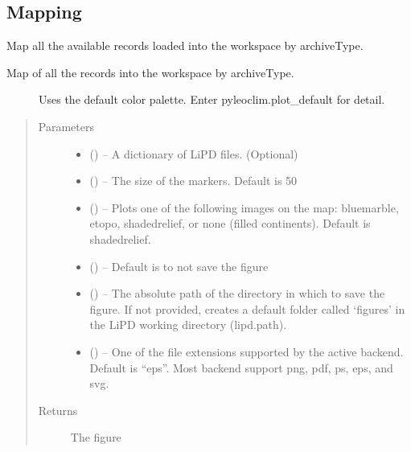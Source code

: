 \documentclass[letterpaper,10pt,english]{sphinxmanual}
\begin{document}
\subsection{Mapping}
\label{\detokenize{Main:mapping}}

\begin{fulllineitems}
\label{\detokenize{Main:pyleoclim.mapAllArchive}}
Map all the available records loaded into the workspace by archiveType.
\begin{description}
\item[{Map of all the records into the workspace by archiveType.}] \leavevmode
Uses the default color palette. Enter pyleoclim.plot\_default for detail.

\end{description}
\begin{quote}\begin{description}
\item[{Parameters}] \leavevmode\begin{itemize}
\item {} 
 () -- A dictionary of LiPD files. (Optional)

\item {} 
 () -- The size of the markers. Default is 50

\item {} 
 () -- Plots one of the following images on the map:
bluemarble, etopo, shadedrelief, or none (filled continents).
Default is shadedrelief.

\item {} 
 () -- Default is to not save the figure

\item {} 
 () -- The absolute path of the directory in which to save the
figure. If not provided, creates a default folder called `figures'
in the LiPD working directory (lipd.path).

\item {} 
 () -- One of the file extensions supported by the active
backend. Default is ``eps''. Most backend support png, pdf, ps, eps,
and svg.

\end{itemize}

\item[{Returns}] \leavevmode
The figure

\end{description}\end{quote}

\end{fulllineitems}
\end{document}
